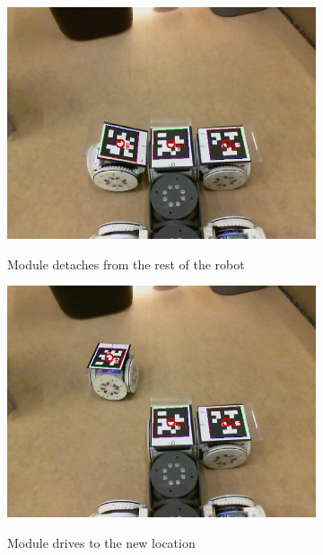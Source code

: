 \documentclass[conference]{IEEEtran}
\begin{document}
\begin{figure}[t]
      \centering
      \begin{subfigure}[t]{0.32\columnwidth}
        \includegraphics[width=\textwidth]{images/reconf_detach.jpg}
        \label{fig:reconfa}
        \caption{Module detaches from the rest of the robot}
    \end{subfigure}
    \begin{subfigure}[t]{0.32\columnwidth}
        \includegraphics[width=\textwidth]{images/reconf_drive.jpg}
        \label{fig:reconfb}
        \caption{Module drives to the new location}
    \end{subfigure}
    \begin{subfigure}[t]{0.32\columnwidth}

\end{subfigure}
\end{figure}
\end{document}
